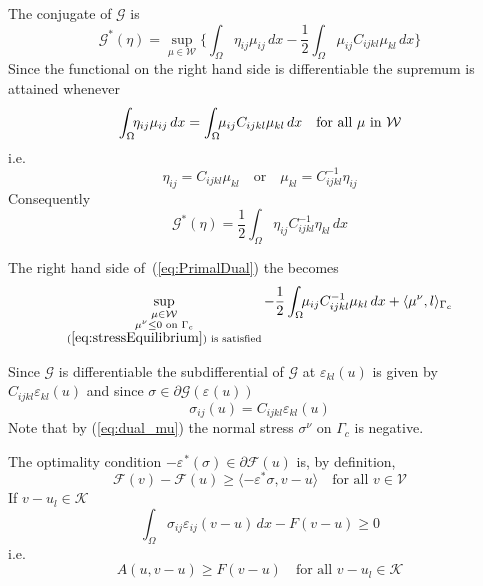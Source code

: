 \documentclass[12pt,a4paper]{article}
\numberwithin{equation}{section}
\numberwithin{table}{section}
\numberwithin{figure}{section}
\newcommand{\W}{\ensuremath{\mathcal{W}}}
\newcommand{\half}{\ensuremath{\frac{1}{2}}}
\newcommand{\V}{\ensuremath{\mathcal{V}}}
\newcommand{\K}{\ensuremath{\mathcal{K}}}
\newcommand{\F}{\ensuremath{{\mathcal F}}}
\newcommand{\G}{\ensuremath{{\mathcal G}}}
\newcommand{\intO}{\int_\Omega\!\!}
\renewcommand{\epsilon}{\varepsilon}
\newcommand{\strain}[1][]{\ensuremath{\epsilon_{#1}}}
\newcommand{\epsij}{\strain[ij]}
\newcommand{\epskl}{\strain[kl]}
\newcommand{\stress}[1][]{\ensuremath{\sigma_{#1}}}
\newcommand{\sigij}{\stress[ij]}
\providecommand{\dualp}[2]{\langle #1, #2 \rangle}
\newcommand{\dx}{{\,dx}}
\begin{document}
The conjugate of $\G$ is
\begin{equation}
  \G^*(\eta) = \sup_{\mu\in \W} \{ \intO \eta_{ij} \mu_{ij} \dx
  - \half \intO \mu_{ij} C_{ijkl} \mu_{kl} \dx \}
\end{equation}
Since the functional on the right hand side is differentiable the
supremum is attained whenever
\begin{equation}
  \label{eq:epsopt}
  \intO \eta_{ij} \mu_{ij} \dx =  \intO \mu_{ij} C_{ijkl} \mu_{kl} \dx
  \quad \text{for all $\mu$ in \W}
\end{equation}
i.e.
\begin{equation}
  \eta_{ij} = C_{ijkl} \mu_{kl}  \quad\text{or}\quad
  \mu_{kl} = C^{-1}_{ijkl} \eta_{ij}
\end{equation}
Consequently
\begin{equation}
  \G^*(\eta) = \half\intO \eta_{ij} C^{-1}_{ijkl} \eta_{kl} \dx
\end{equation}

The right hand side of~(\ref{eq:PrimalDual}) the becomes
\begin{equation}
  \label{eq:dual_mu}
  \sup_{\substack{
      \mu\in \W\\
      \mu^\nu \le 0 \text{ on }\Gamma_c\\
      (\ref{eq:stressEquilibrium})\text{ is satisfied}
    }}
    -\half\intO \mu_{ij} C^{-1}_{ijkl} \mu_{kl} \dx
  + \dualp{\mu^\nu}{l}_{\Gamma_c}
\end{equation}

Since $\G$ is differentiable the subdifferential of $\G$ at
$\epskl(u)$ is given by $C_{ijkl} \epskl(u)$ and since $\sigma\in
\partial \G(\strain(u))$
\begin{equation}
  \label{eq:stressStrainOptimal}
  \sigij(u) = C_{ijkl} \epskl(u)
\end{equation}
Note that by (\ref{eq:dual_mu}) the normal stress $\sigma^\nu$ on $\Gamma_c$ is negative.
 

The optimality condition $-\strain^*(\sigma) \in \partial \F(u)$
is, by definition,
\begin{equation}
  \F(v) - \F(u) \ge \dualp{-\epsilon^* \sigma}{v-u} \quad\text{for all $v\in \V$}
\end{equation}
If $v-u_l\in \K$
\begin{equation}
  \int_{\Omega}\!\! \sigij \epsij(v-u) \dx - F(v-u) \ge 0
\end{equation}
i.e.\
\begin{equation}
  A(u, v-u) \ge F(v-u) \quad\text{for all $v-u_l\in \K$}
\end{equation}
\end{document}
